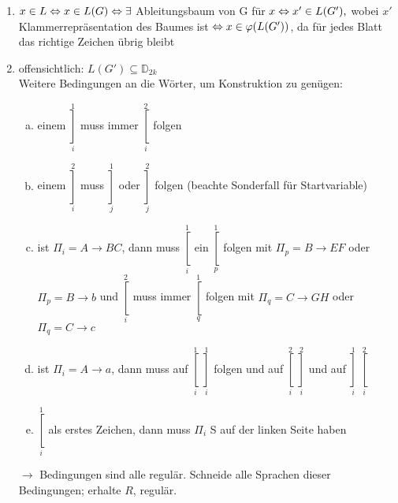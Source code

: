        \begin{enumerate}[1)]
            \item $x\in L \Leftrightarrow x\in L(G)\\\Leftrightarrow \exists$ Ableitungsbaum von G für $x\\\Leftrightarrow x'\in L(G'),$ wobei $x'$ Klammerrepräsentation des Baumes ist$\\\Leftrightarrow x\in\varphi(L(G'))$, da für jedes Blatt das richtige Zeichen übrig bleibt
            \item offensichtlich: $L(G')\subseteq\mathds{D}_{2k}$\\
            Weitere Bedingungen an die Wörter, um Konstruktion zu genügen:
            \begin{enumerate}[a)]
                \item einem $\mathop{]}\limits_i^1$ muss immer $\mathop{[}\limits_i^2$ folgen
                \item einem $\mathop{]}\limits_i^2$ muss $\mathop{]}\limits_j^1$ oder $\mathop{]}\limits_j^2$ folgen (beachte Sonderfall für Startvariable)
                \item ist $\Pi_i=A\rightarrow BC$, dann muss $\mathop{[}\limits_i^1$ ein $\mathop{[}\limits_p^1$ folgen mit $\Pi_p=B\rightarrow EF$ oder $\Pi_p=B\rightarrow b$ und $\mathop{[}\limits_i^2$ muss immer $\mathop{[}\limits_q^1$ folgen mit $\Pi_q=C\rightarrow GH$ oder $\Pi_q=C\rightarrow c$
                \item ist $\Pi_i=A\rightarrow a$, dann muss auf $\mathop{[}\limits_i^1$ $\mathop{]}\limits_i^1$ folgen und auf $\mathop{[}\limits_i^2$ $\mathop{]}\limits_i^2$ und auf $\mathop{]}\limits_i^1$ $\mathop{[}\limits_i^2$
                \item $\mathop{[}\limits_i^1$ als erstes Zeichen, dann muss $\Pi_i$ S auf der linken Seite haben
            \end{enumerate}
            \item[$\rightarrow$] Bedingungen sind alle regulär. Schneide alle Sprachen dieser Bedingungen; erhalte $R$, regulär.
        \end{enumerate}
